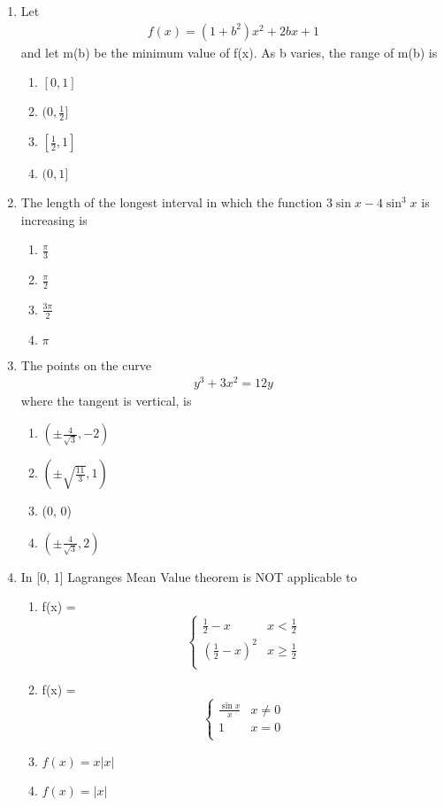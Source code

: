 \begin{enumerate}[label=\arabic*.,ref=\thesubsection.\theenumi]
\item Let 
\begin{align} 
f(x) = (1 + b^2)x^2 + 2bx + 1
\end{align} 
and let m(b) be the minimum value of f(x). As b varies, the range of m(b) is
\begin{enumerate}
\item $[0, 1]$
\item $(0, \frac{1}{2}]$
\item $[\frac{1}{2} ,1]$
\item $(0, 1]$
\end{enumerate}

\item The length of the longest interval in which the function $3\sin x - 4\sin^3x$ is increasing is
\begin{enumerate}
\item $\frac{\pi}{3}$
\item $\frac{\pi}{2}$
\item $\frac{3\pi}{2}$
\item ${\pi}$
\end{enumerate}

\item The points on the curve 
\begin{align} 
y^3 + 3x^2 = 12y
\end{align} 
where the tangent is vertical, is 
\begin{enumerate}
\item $(\pm\frac{4}{\sqrt{3}}, -2)$
\item $(\pm\sqrt{\frac{11}{3}}, 1)$
\item (0, 0)
\item $(\pm\frac{4}{\sqrt{3}}, 2)$
\end{enumerate}

\item In [0, 1] Lagranges Mean Value theorem is NOT applicable to
\begin{enumerate}
\item 
f(x) =
\[\begin{cases} 
      \frac{1}{2} - x &  x < \frac{1}{2} \\
      (\frac{1}{2} - x)^2 & x \geq \frac{1}{2} \\
   \end{cases}\] 
\item 
f(x) =
\[\begin{cases} 
      \frac{\sin x}{x} &  x \neq 0 \\
      1 & x = 0\\
   \end{cases}\] 
\item $f(x) = x|x|$
\item $f(x) = |x|$
\end{enumerate}


\end{enumerate}
